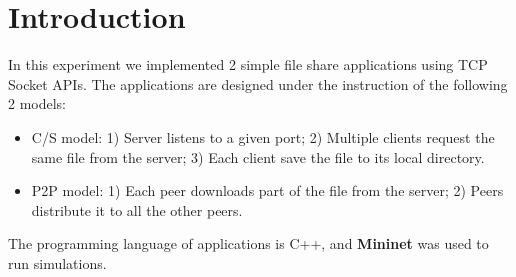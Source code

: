 \section{Introduction}
In this experiment we implemented 2 simple file share applications using TCP Socket APIs. The applications are designed under the instruction of the following 2 models:
\begin{itemize}
\item C/S model: 1) Server listens to a given port; 2) Multiple clients request the same file from the server; 3) Each client save the file to its local directory.
\item P2P model: 1) Each peer downloads part of the file from the server; 2) Peers distribute it to all the other peers.
\cite{Assignment}
\end{itemize}
The programming language of applications is C++, and \textbf{Mininet} was used to run simulations.